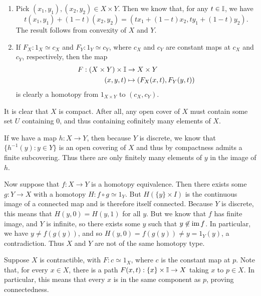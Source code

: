 \documentclass[../../solutions.tex]{subfiles}
\begin{document}
\begin{exercise} \leavevmode
\begin{enumerate}
\item Pick $(x_1,y_1),(x_2,y_2)\in X\times Y$. Then we know that, for any $t\in\mathbb I$, we have \[t(x_1,y_1)+(1-t)(x_2,y_2)=(tx_1+(1-t)x_2,ty_1+(1-t)y_2).\] The result follows from convexity of $X$ and $Y$. 

\item If $F_X:1_X\simeq c_X$ and $F_Y:1_Y\simeq c_Y$, where $c_X$ and $c_Y$ are constant maps at $c_X$ and $c_Y$, respectively, then the map \begin{align*}F:(X\times Y)\times\mathbb I&\to X\times Y\\(x,y,t)&\mapsto(F_X(x,t),F_Y(y,t))\end{align*} is clearly a homotopy from $1_{X\times Y}$ to $(c_X,c_Y)$. 
\end{enumerate} 
\end{exercise} 

\begin{exercise} \leavevmode
It is clear that $X$ is compact. After all, any open cover of $X$ must contain some set $U$ containing 0, and thus containing cofinitely many elements of $X$. 

If we have a map $h:X\to Y$, then because $Y$ is discrete, we know that $\{h^{-1}(y):y\in Y\}$ is an open covering of $X$ and thus by compactness admits a finite subcovering. Thus there are only finitely many elements of $y$ in the image of $h$. 

Now suppose that $f:X\to Y$ is a homotopy equivalence. Then there exists some $g:Y\to X$ with a homotopy $H:f\circ g\simeq1_Y$. But $H(\{y\}\times I)$ is the continuous image of a connected map and is therefore itself connected. Because $Y$ is discrete, this means that $H(y,0)=H(y,1)$ for all $y$. But we know that $f$ has finite image, and $Y$ is infinite, so there exists some $y$ such that $y\not\in\operatorname{im} f$. In particular, we have $y\ne f(g(y))$, and so $H(y,0)=f(g(y))\ne y=1_Y(y)$, a contradiction. Thus $X$ and $Y$ are not of the same homotopy type. 
\end{exercise} 

\begin{exercise} \leavevmode
Suppose $X$ is contractible, with $F:c\simeq1_X$, where $c$ is the constant map at $p$. Note that, for every $x\in X$, there is a path $F(x,t):\{x\}\times\mathbb I\to X$ taking $x$ to $p\in X$. In particular, this means that every $x$ is in the same component as $p$, proving connectedness. 
\end{exercise} 
\end{document}
